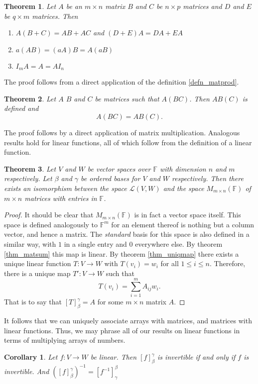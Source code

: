 \documentclass[oneside, 12pt]{book}
\newtheorem{thm}{Theorem}[section]
\newtheorem{cor}{Corollary}[section]
\theoremstyle{definition}
\begin{document}
\begin{thm}
\label{thm_matt}
  Let $A$ be an $m \times n$ matrix $B$ and $C$ be $n \times p$ matrices and $D$ and $E$ be $q \times m$ matrices. Then
  \begin{enumerate}
    \item $A(B+C)=AB+AC$ and $(D+E)A=DA+EA$
    \item $a(AB)=(aA)B=A(aB)$
    \item$I_{m}A=A=AI_{n}$
  \end{enumerate}
\end{thm}
The proof follows from a direct application of the definition \ref{defn_matprod}.
\begin{thm}
\label{mat_assc}
  Let $A$ $B$ and $C$ be matrices such that $A(BC)$. Then $AB(C)$ is defined and \[A(BC)=AB(C).\]
\end{thm}
The proof follows by a direct application of matrix multiplication. Analogous results hold for linear functions, all of which follow from the definition of a linear function.
\begin{thm}
\label{thm_matiso}
  Let $V$ and $W$ be vector spaces over $\mathbb{F}$ with dimension $n$ and $m$ respectively. Let $\beta$ and $\gamma$ be ordered bases for $V$ and $W$ respectively. Then there exists an isomorphism between the space $\mathcal{L}(V,W)$ and the space $M_{m \times n}(\mathbb{F})$ of $m \times n$ matrices with entries in $\mathbb{F}$.
\end{thm}
\begin{proof}
  It should be clear that $M_{m \times n}(\mathbb{F})$ is in fact a vector space itself. This space is defined analogously to $\mathbb{F}^{m}$ for an element thereof is nothing but a column vector, and hence a matrix. The \emph{standard} basis for this space is also defined in a similar way, with $1$ in a single entry and $0$ everywhere else.
  By theorem \ref{thm_matsum} this map is linear. By theorem \ref{thm_uniqmap} there exists a unique linear function $T: V \to W$ with $T(v_{i})=w_{i}$ for all $1 \leq i \leq n$. Therefore, there is a unique map $T':V \to W$ such that \[T(v_{i})=\sum_{i=1}^{m}A_{ij}w_{i}.\] That is to say that $[T]_{\beta}^{\gamma}=A$ for some $m \times n$ matrix $A$.
\end{proof}
It follows that we can uniquely associate arrays with matrices, and matrices with linear functions. Thus, we may phrase all of our results on linear functions in terms of multiplying arrays of numbers.
\begin{cor}
\label{thm_matinv}
Let $f: V \to W$ be linear. Then $[f]_{\beta}^{\gamma}$ is invertible if and only if $f$ is invertible. And $([f]_{\beta}^{\gamma})^{-1}=[f^{-1}]_{\gamma}^{\beta}$
\end{cor}
\end{document}

